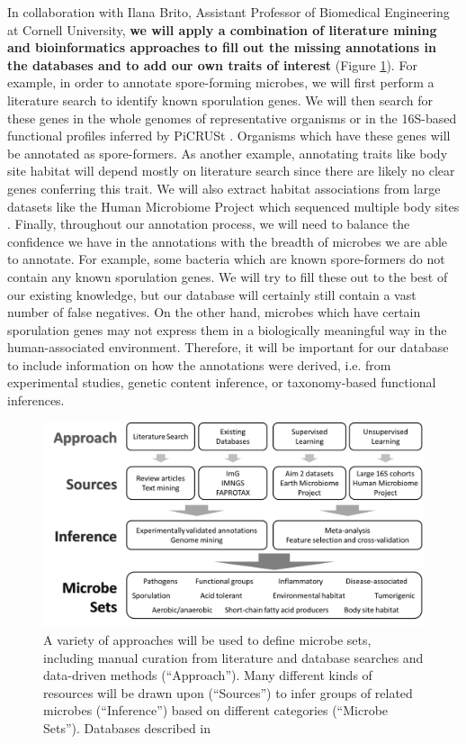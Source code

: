 \documentclass[12pt]{article}
\begin{document}
In collaboration with Ilana Brito, Assistant Professor of Biomedical Engineering at Cornell University, 
\textbf{we will apply a combination of literature mining and bioinformatics approaches to fill 
out the missing annotations in the databases and to add our own traits
of interest} (Figure \ref{fig:microbe_sets}). 
For example, in order to annotate spore-forming microbes, we will first perform a literature
search to identify known sporulation genes. We will then search for these genes in 
the whole genomes of representative organisms or in the 16S-based functional
profiles inferred by PiCRUSt \cite{langille-picrust-2013}.
Organisms which have these genes will be annotated as spore-formers. 
As another example, annotating traits like body site habitat will 
depend mostly on literature search since there are likely no clear genes
conferring this trait. We will also extract habitat associations
from large datasets like the Human Microbiome Project which sequenced multiple body sites \cite{hmp-2012}.
Finally, throughout our annotation process, we will need to balance
the confidence we have in the annotations with
the breadth of microbes we are able to annotate.
For example, some bacteria which are known spore-formers do not contain any
known sporulation genes. We will try to fill these out to the best of our
existing knowledge, but our database will certainly 
still contain a vast number of false negatives.
On the other hand, microbes which have certain sporulation genes
may not express them in a biologically meaningful way in the human-associated
environment. Therefore, it will be important for our database to include information
on how the annotations were derived, i.e. from experimental studies, genetic content 
inference, or taxonomy-based functional inferences.

\begin{figure}
\begin{center}
	\includegraphics[scale=0.4]{microbe_sets}
	\caption{A variety of approaches will be used to define
	microbe sets, including manual curation from literature
	and database searches and data-driven methods (``Approach'').
	Many different kinds of resources will be drawn upon 
	(``Sources'') to infer groups of related microbes 
	(``Inference'') based on different categories 
	(``Microbe Sets''). Databases described in \cite{markowitz-img-2013, louca-faprotax-2016, lagkouvardos-imngs-2016}}
	\label{fig:microbe_sets}
\end{center}
\end{figure}
\end{document}
